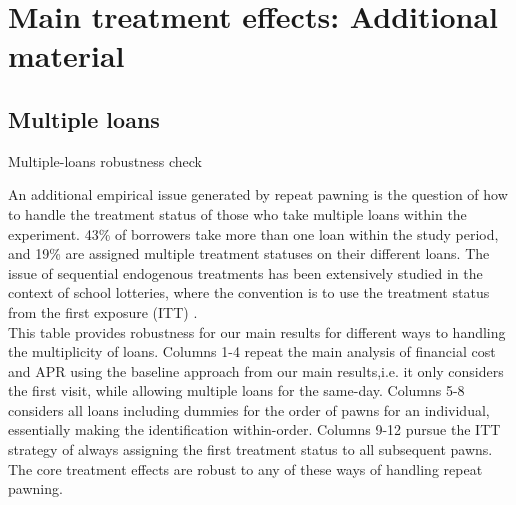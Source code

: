 \newpage
\section{Main treatment effects: Additional material}


\begin{landscape}
\subsection{Multiple loans}

\begin{table}[H]
\caption{Multiple-loans robustness check}
\label{multiple_loans}
\begin{center}
\scriptsize{}
\end{center}
 \scriptsize
 An additional empirical issue generated by repeat pawning is the question of how to handle the treatment status of those who take multiple loans within the experiment.  43\% of borrowers take more than one loan within the study period, and 19\% are assigned multiple treatment statuses on their different loans.  The issue of sequential endogenous treatments has been extensively studied in the context of school lotteries, where the convention is to use the treatment status from the first exposure (ITT) \citep{cullen2006effect, abdulkadirouglu2011accountability}.\\
 
 This table provides robustness for our main results for different ways to handling the multiplicity of loans. Columns 1-4 repeat the main analysis of financial cost and APR using the baseline approach from our main results,i.e. it only considers the first visit, while allowing multiple loans for the same-day. Columns 5-8 considers all loans including dummies for the order of pawns for an individual, essentially making the identification within-order.  Columns 9-12 pursue the ITT strategy of always assigning the first treatment status to all subsequent pawns. The core treatment effects are robust to any of these ways of handling repeat pawning.  
 
\end{table}


\end{landscape}


